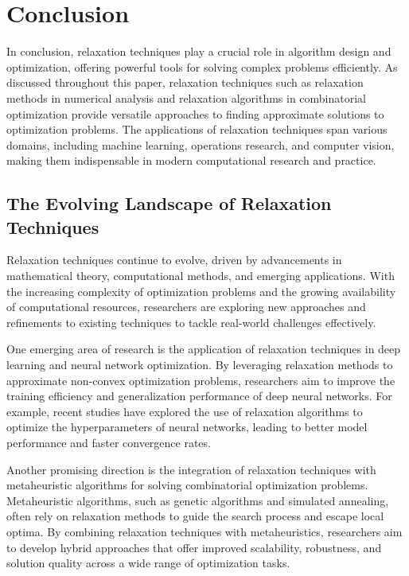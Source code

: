 \documentclass[12pt]{book} %
\begin{document}
\section{Conclusion}

In conclusion, relaxation techniques play a crucial role in algorithm design and optimization, offering powerful tools for solving complex problems efficiently. As discussed throughout this paper, relaxation techniques such as relaxation methods in numerical analysis and relaxation algorithms in combinatorial optimization provide versatile approaches to finding approximate solutions to optimization problems. The applications of relaxation techniques span various domains, including machine learning, operations research, and computer vision, making them indispensable in modern computational research and practice.

\subsection{The Evolving Landscape of Relaxation Techniques}

Relaxation techniques continue to evolve, driven by advancements in mathematical theory, computational methods, and emerging applications. With the increasing complexity of optimization problems and the growing availability of computational resources, researchers are exploring new approaches and refinements to existing techniques to tackle real-world challenges effectively.

One emerging area of research is the application of relaxation techniques in deep learning and neural network optimization. By leveraging relaxation methods to approximate non-convex optimization problems, researchers aim to improve the training efficiency and generalization performance of deep neural networks. For example, recent studies have explored the use of relaxation algorithms to optimize the hyperparameters of neural networks, leading to better model performance and faster convergence rates.

Another promising direction is the integration of relaxation techniques with metaheuristic algorithms for solving combinatorial optimization problems. Metaheuristic algorithms, such as genetic algorithms and simulated annealing, often rely on relaxation methods to guide the search process and escape local optima. By combining relaxation techniques with metaheuristics, researchers aim to develop hybrid approaches that offer improved scalability, robustness, and solution quality across a wide range of optimization tasks.
\end{document}
